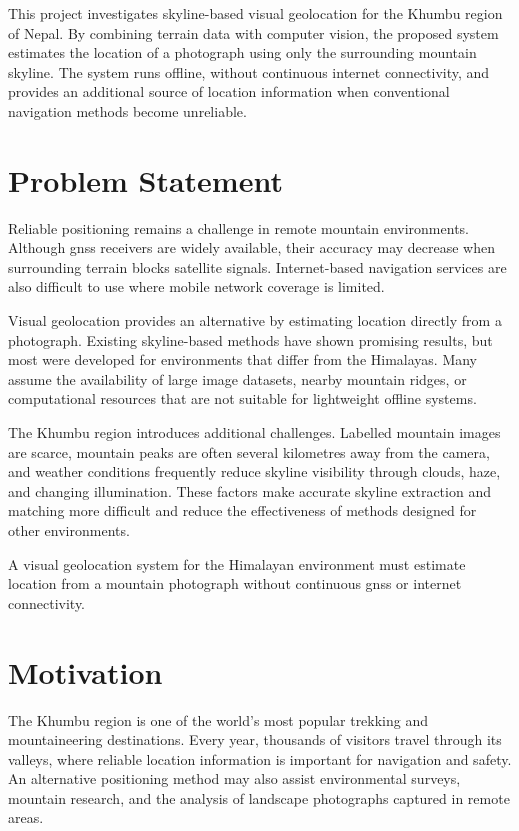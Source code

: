 This project investigates skyline-based visual geolocation for the Khumbu region of Nepal. By combining terrain data with computer vision, the proposed system estimates the location of a photograph using only the surrounding mountain skyline. The system runs offline, without continuous internet connectivity, and provides an additional source of location information when conventional navigation methods become unreliable.

\section{Problem Statement}

Reliable positioning remains a challenge in remote mountain environments. Although \Gls{gnss} receivers are widely available, their accuracy may decrease when surrounding terrain blocks satellite signals. Internet-based navigation services are also difficult to use where mobile network coverage is limited.

Visual geolocation provides an alternative by estimating location directly from a photograph. Existing skyline-based methods have shown promising results, but most were developed for environments that differ from the Himalayas. Many assume the availability of large image datasets, nearby mountain ridges, or computational resources that are not suitable for lightweight offline systems.

The Khumbu region introduces additional challenges. Labelled mountain images are scarce, mountain peaks are often several kilometres away from the camera, and weather conditions frequently reduce skyline visibility through clouds, haze, and changing illumination. These factors make accurate skyline extraction and matching more difficult and reduce the effectiveness of methods designed for other environments.

A visual geolocation system for the Himalayan environment must estimate location from a mountain photograph without continuous \Gls{gnss} or internet connectivity.

\section{Motivation}

The Khumbu region is one of the world's most popular trekking and mountaineering destinations. Every year, thousands of visitors travel through its valleys, where reliable location information is important for navigation and safety. An alternative positioning method may also assist environmental surveys, mountain research, and the analysis of landscape photographs captured in remote areas.

